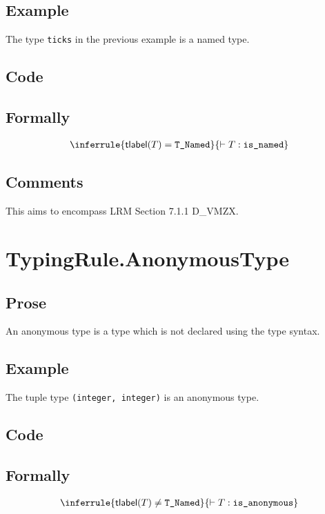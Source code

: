 \documentclass{book}
\newcommand\typelabel[0]{\textsf{tlabel}} %
\newcommand\isnamed[0]{\texttt{is\_named}}
\newcommand\isanonymous[0]{\texttt{is\_anonymous}}
\begin{document}
    \subsection{Example}
    The type \texttt{ticks} in the previous example is a named type.

    \subsection{Code}

\begin{formal}
      \subsection{Formally}
\[
\begin{array}{c}
\inferrule{\typelabel(T) = \TNamed}{\entails T : \isnamed}
\end{array}
\]
\end{formal}

    \subsection{Comments}
    This aims to encompass LRM Section 7.1.1 D\_VMZX.

\section{TypingRule.AnonymousType \label{sec:TypingRule.AnonymousType}}

    \subsection{Prose}
    An anonymous type is a type which is not declared using the type syntax.

    \subsection{Example}
    The tuple type \texttt{(integer, integer)} is an anonymous type.

    \subsection{Code}

\begin{formal}
      \subsection{Formally}
\[
\begin{array}{c}
\inferrule{\typelabel(T) \neq \TNamed}{\entails T : \isanonymous}
\end{array}
\]
\end{formal}
\end{document}
